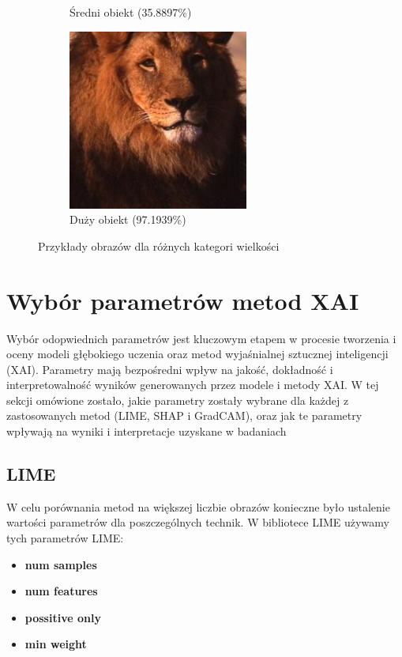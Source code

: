\begin{figure}[h]
\begin{subfigure}[b]{0.3\textwidth}
		\caption{Średni obiekt (35.8897\%)}  \label{}
	\end{subfigure}
	\begin{subfigure}[b]{0.3\textwidth}
		\centering\includegraphics[width=.9\textwidth]{img/examples/size_category_big}
		\caption{Duży obiekt (97.1939\%)}  \label{}
	\end{subfigure}
	\caption{Przykłady obrazów dla różnych kategori wielkości}
	\label{rys:examples_size_cat}
\end{figure}

\section*{Wybór parametrów metod XAI}
Wybór odopwiednich parametrów jest kluczowym etapem w procesie tworzenia i oceny modeli głębokiego uczenia oraz metod wyjaśnialnej sztucznej inteligencji (XAI).
Parametry mają bezpośredni wpływ na jakość, dokładność i interpretowalność wyników generowanych przez modele i metody XAI.
W tej sekcji omówione zostało, jakie parametry zostały wybrane dla każdej z zastosowanych metod (LIME, SHAP i GradCAM), oraz jak te parametry wpływają na wyniki i interpretacje uzyskane w badaniach

\subsection*{LIME}
W celu porównania metod na większej liczbie obrazów konieczne było ustalenie wartości parametrów dla poszczególnych technik.
W bibliotece LIME używamy tych parametrów LIME:
\begin{itemize}
	\item \textbf{num samples}
	\item \textbf{num features}
	\item \textbf{possitive only}
	\item \textbf{min weight}
\end{itemize}

